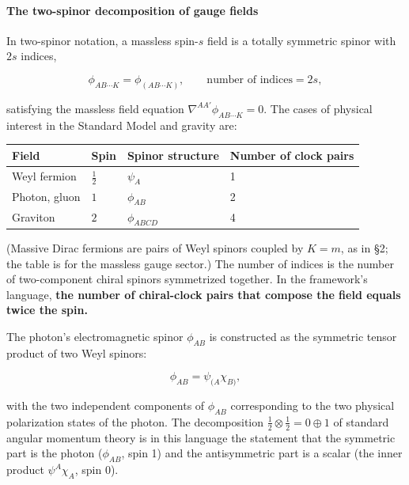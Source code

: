 \documentclass[
]{article}
\newcounter{none} %
\begin{document}
\paragraph{The two-spinor decomposition of gauge
fields}\label{the-two-spinor-decomposition-of-gauge-fields}

In two-spinor notation, a massless spin-\(s\) field is a totally
symmetric spinor with \(2s\) indices,

\[\phi_{AB\cdots K} = \phi_{(AB\cdots K)}, \qquad \text{number of indices} = 2s,\]

satisfying the massless field equation \(\nabla^{AA'}\phi_{AB\cdots K} =
0\). The cases of physical interest in the Standard Model and gravity
are:

{\def\LTcaptype{none} %
\begin{longtable}[]{@{}llll@{}}
\toprule\noalign{}
Field & Spin & Spinor structure & Number of clock pairs \\
\midrule\noalign{}
\endhead
\bottomrule\noalign{}
\endlastfoot
Weyl fermion & \(\tfrac{1}{2}\) & \(\psi_A\) & 1 \\
Photon, gluon & \(1\) & \(\phi_{AB}\) & 2 \\
Graviton & \(2\) & \(\phi_{ABCD}\) & 4 \\
\end{longtable}
}

(Massive Dirac fermions are pairs of Weyl spinors coupled by \(K = m\),
as in §2; the table is for the massless gauge sector.) The number of
indices is the number of two-component chiral spinors symmetrized
together. In the framework's language, \textbf{the number of
chiral-clock pairs that compose the field equals twice the spin.}

The photon's electromagnetic spinor \(\phi_{AB}\) is constructed as the
symmetric tensor product of two Weyl spinors:

\[\phi_{AB} = \psi_{(A} \chi_{B)},\]

with the two independent components of \(\phi_{AB}\) corresponding to
the two physical polarization states of the photon. The decomposition
\(\tfrac{1}{2} \otimes \tfrac{1}{2} = 0 \oplus 1\) of standard angular
momentum theory is in this language the statement that the symmetric
part is the photon (\(\phi_{AB}\), spin 1) and the antisymmetric part is
a scalar (the inner product \(\psi^A \chi_A\), spin 0).
\end{document}
